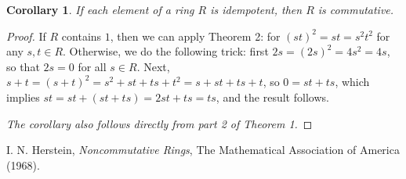 \documentclass[12pt]{article}
\begin{document}
\newtheorem{cor}[thm]{Corollary}
\begin{cor} If each element of a ring $R$ is idempotent, then $R$ is commutative.
\end{cor}
\begin{proof}
If $R$ contains $1$, then we can apply Theorem 2: for $(st)^2=st=s^2t^2$ for any $s,t\in R$.  Otherwise, we do the following trick: first $2s = (2s)^2 = 4s^2 = 4s$, so that $2s=0$ for all $s\in R$.  Next, $s+t = (s+t)^2 = s^2 + st + ts + t^2 = s+st+ts+t$, so $0=st+ts$, which implies $st=st+(st+ts)=2st + ts=ts$, and the result follows.

\textit{The corollary also follows directly from part 2 of Theorem 1.}
\end{proof}

\begin{thebibliography}{8}
 I. N. Herstein, \emph{Noncommutative Rings}, The Mathematical Association of America (1968).
\end{thebibliography}
\end{document}
